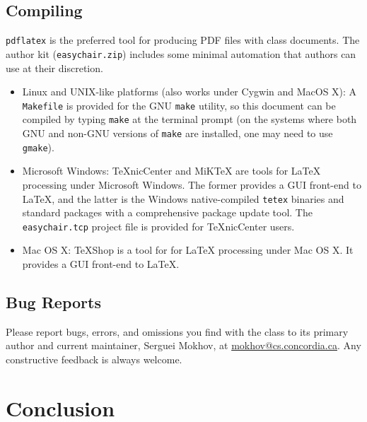 \documentclass{easychair}
\newcommand{\easychair}{\sf{easychair}}
\newcommand{\miktex}{MiK{\TeX}}
\newcommand{\texniccenter}{{\TeX}nicCenter}
\newcommand{\makefile}{\texttt{Makefile}}
\begin{document}
\subsection{Compiling}
\label{sect:compiling}

\texttt{pdflatex} \cite{pdflatex-instructions} is the preferred tool for
producing PDF files with {\easychair} class documents.
The author kit (\texttt{easychair.zip}) includes some minimal automation 
that authors can use at their discretion.

\begin{itemize}
\item
Linux and UNIX-like platforms (also works under Cygwin and MacOS X):
A {\makefile} is provided for the GNU \texttt{make} \cite{gmake} utility,
so this document can be compiled by typing \texttt{make} at the terminal 
prompt (on the systems where both GNU and non-GNU versions of \texttt{make} 
are installed, one may need to use \texttt{gmake}).

\item
Microsoft Windows:
{\texniccenter} \cite{texniccenter} and {\miktex} \cite{miktex} are tools
for {\LaTeX} processing under Microsoft Windows. 
The former provides a GUI front-end to {\LaTeX}, and the latter is the 
Windows native-compiled \texttt{tetex} binaries and standard packages with 
a comprehensive package update tool. 
The \texttt{easychair.tcp} project file is provided for {\texniccenter} users.

\item
Mac OS X:
TeXShop \cite{texshop} is a tool for for {\LaTeX} processing under Mac OS X.
It provides a GUI front-end to {\LaTeX}.

\end{itemize}

\subsection{Bug Reports}
\label{sec:bug-reports}

Please report bugs, errors, and omissions you find with the {\easychair} 
class to its primary author and current maintainer, Serguei Mokhov,
at \url{mokhov@cs.concordia.ca}. 
Any constructive feedback is always welcome.

\section{Conclusion}
\label{sect:conclusion}
\end{document}
